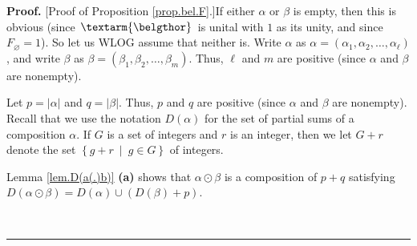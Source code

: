 \documentclass
[numbers=enddot,12pt,final,onecolumn,notitlepage,abstracton]{scrartcl}%
\theoremstyle{definition}
\newenvironment{proof}[1][Proof]{\noindent\textbf{#1.} }{\ \rule{0.5em}{0.5em}}
\newenvironment{verlong}{}{}
\newcommand{\bel}{\left. \textarm{\belgthor} \right.}
\begin{document}
\begin{proof}
[Proof of Proposition \ref{prop.bel.F}.]If either $\alpha$ or $\beta$ is
empty, then this is obvious (since $\bel $ is unital with $1$ as its unity,
and since $F_{\varnothing}=1$). So let us WLOG assume that neither is. Write
$\alpha$ as $\alpha=\left(  \alpha_{1},\alpha_{2},\ldots,\alpha_{\ell}\right)
$, and write $\beta$ as $\beta=\left(  \beta_{1},\beta_{2},\ldots,\beta
_{m}\right)  $. Thus, $\ell$ and $m$ are positive (since $\alpha$ and $\beta$
are nonempty).

Let $p=\left\vert \alpha\right\vert $ and $q=\left\vert \beta\right\vert $.
Thus, $p$ and $q$ are positive (since $\alpha$ and $\beta$ are nonempty).
Recall that we use the notation $D\left(  \alpha\right)  $ for the set of
partial sums of a composition $\alpha$. If $G$ is a set of integers and $r$ is
an integer, then we let $G+r$ denote the set $\left\{  g+r\ \mid\ g\in
G\right\}  $ of integers.

\begin{verlong}
Lemma \ref{lem.D(a(.)b)} \textbf{(a)} shows that $\alpha\odot\beta$ is a
composition of $p+q$ satisfying $D\left(  \alpha\odot\beta\right)  =D\left(
\alpha\right)  \cup\left(  D\left(  \beta\right)  +p\right)  $.
\end{verlong}


\end{proof}
\end{document}

